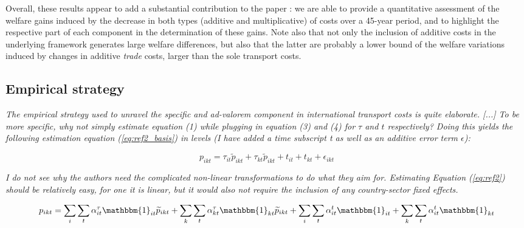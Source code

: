 \documentclass[a4paper,11pt]{article}
\begin{document}
Overall, these results appear to add a substantial contribution to the paper : we are able to provide a quantitative assessment of the welfare gains induced by the decrease in both types (additive and multiplicative) of costs over a 45-year period, and to highlight the respective part of each component in the determination of these gains. Note also that not only the inclusion of additive costs in the underlying framework generates large welfare differences, but also that the latter are probably a lower bound of the welfare variations induced by changes in additive \emph{trade} costs, larger than the sole transport costs.





\subsection{Empirical strategy}

\textit{The empirical strategy used to unravel the specific and ad-valorem component in international
transport costs is quite elaborate. [...] To be more specific, why not simply estimate equation (1) while plugging
in equation (3) and (4) for $\tau$ and $t$ respectively? Doing this yields the following estimation equation (\ref{eq:ref2_basis}) in
levels (I have added a time subscript t as well as an additive error term $\epsilon$):}

\begin{equation}
p_{ikt}=\tau_{it}\widetilde{p}_{ikt}+ \tau_{kt}\widetilde{p}_{ikt} + t_{it} + t_{kt} + \epsilon_{ikt}   \label{eq:ref2_basis}
\end{equation}

\textit{I do not see why the authors need the complicated non-linear transformations to do what they aim
for. Estimating Equation (\ref{eq:ref2}) should be relatively easy, for one it is linear, but it would also not require the
inclusion of any country-sector fixed effects.}

\begin{equation}
p_{ikt}= \sum_i \sum_t \alpha_{it}^\tau \mathbbm{1}_{it}\widetilde{p}_{ikt} +  \sum_k \sum_t \alpha_{kt}^\tau \mathbbm{1}_{kt}\widetilde{p}_{ikt} + \sum_i \sum_t \alpha_{it}^t \mathbbm{1}_{it} + \sum_k \sum_t \alpha_{it}^t\mathbbm{1}_{kt} \label{eq:ref2}
\end{equation}
\end{document}
